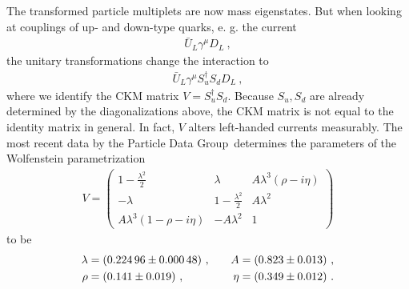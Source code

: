 The transformed particle multiplets are now mass eigenstates. But when looking at couplings of up- and down-type quarks, e. g. the current
\begin{align*}
	\bar{U}_L\gamma^\mu D_L \ ,
\end{align*}
the unitary transformations change the interaction to
\begin{align*}
	\bar{U}_L\gamma^\mu S_u^\dagger S_d D_L \ ,
\end{align*}
where we identify the CKM matrix $V=S_u^\dagger S_d$. Because $S_u,S_d$ are already determined by the diagonalizations above, the CKM matrix is not equal to the identity matrix in general. In fact, $V$ alters left-handed currents measurably. The most recent data by the Particle Data Group\footnotemark\ determines the parameters of the Wolfenstein parametrization
\begin{align*}
	V = \begin{pmatrix}
	1-\frac{\lambda^2}{2} & \lambda & A\lambda^3(\rho-i\eta) \\
	-\lambda & 1-\frac{\lambda^2}{2} & A\lambda^2 \\
	A\lambda^3(1-\rho-i\eta) & -A\lambda^2 & 1
	\end{pmatrix}
\end{align*}
to be \cite[Chapter 12]{PDG}
\begin{align}\label{eq:Wolf}
	\lambda &= \SI{0.22496(48)}{} \ , && &A &= \SI{0.823(13)}{} \ , \notag \\
	\rho &= \SI{0.141(19)}{} \ , && &\eta &= \SI{0.349(12)}{} \ .
\end{align}
